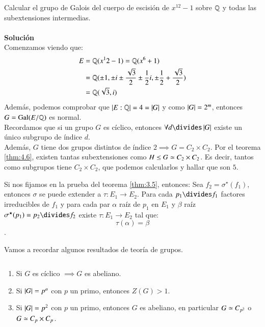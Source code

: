 \begin{ex}[H4.5]
    Calcular el grupo de Galois del cuerpo de escisión de $x^12 - 1$ sobre $\mathbb{Q}$ y todas las subextensiones intermedias.\\\\
    \textbf{Solución}\\
    Comenzamos viendo que:
    \begin{align*}
        E &= \mathbb{Q}(x^12-1) = \mathbb{Q}(x^6+1)\\
          &=\mathbb{Q}(\pm 1, \pm i \pm \frac{\sqrt 3}{2} \pm \frac{1}{2}i, \pm\frac{1}{2} + \frac{\sqrt 3}{2})\\
          &= \mathbb{Q}(\sqrt 3, i)
    \end{align*}
    Además, podemos comprobar que $\left|E:\mathbb{Q}\right| = 4 = \left|G\right|$ y como $\left|G\right| = 2^m$, entonces $G = \mathrm{Gal}(E/\mathbb{Q})$ es normal.\\
    Recordamos que si un grupo $G$ es cíclico, entonces $\forall d \divides \vabs{G}$ existe un único subgrupo de índice $d$.\\
    Además, $G$ tiene dos grupos distintos de índice $2 \implies G = C_2 \times C_2$.
    Por el teorema \ref{thm:4.6}, existen tantas subextensiones como $H \leq G \simeq C_2 \times C_2$. Es decir, tantos como subgrupos tiene $C_2 \times C_2$, que podemos calcularlos y hallar que son $5$.
\end{ex}
\begin{obs}
    Si nos fijamos en la prueba del teorema \ref{thm:3.5}, entonces:
    Sea $f_2 = \sigma^\star(f_1)$, entonces $\sigma$ se puede extender a $\tau: E_1 \to E_2$. Para cada $p_1 \divides f_1$ factores irreducibles de $f_1$ y para cada par $\alpha$ raíz de $p_1$ en $E_1$ y $\beta$ raíz $\sigma^\star(p_1) = p_2 \divides f_2$ existe $\tau: E_1 \to E_2$ tal que:
    $$
        \tau(\alpha) = \beta
    $$.
\end{obs}


Vamos a recordar algunos resultados de teoría de grupos.
\begin{pro}$ $
    \begin{enumerate}
        \item Si $G$ es cíclico $\implies G$ es abeliano.
        \item Si $\left|G\right| = p^a$ con $p$ un primo, entonces $Z(G) > 1$.
        \item Si $\left|G\right| = p^2$ con $p$ un primo, entonces $G$ es abeliano, en particular $G \simeq C_{p^2}$ o $G \simeq C_p \times C_p$.
    \end{enumerate}
\end{pro}

